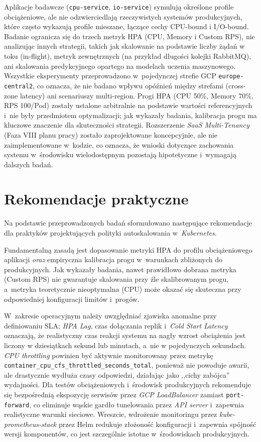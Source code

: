 Aplikacje badawcze (\texttt{cpu-service}, \texttt{io-service}) symulują określone profile obciążeniowe, ale nie odzwierciedlają rzeczywistych systemów produkcyjnych, które często wykazują profile mieszane, łączące cechy CPU-bound i I/O-bound. Badanie ogranicza się do trzech metryk HPA (CPU, Memory i Custom RPS), nie analizując innych strategii, takich jak skalowanie na podstawie liczby żądań w toku (in-flight), metryk zewnętrznych (na przykład długości kolejki RabbitMQ), ani skalowania predykcyjnego opartego na modelach uczenia maszynowego. Wszystkie eksperymenty przeprowadzono w~pojedynczej strefie GCP \texttt{europe-central2}, co oznacza, że nie badano wpływu opóźnień między strefami (cross-zone latency) ani scenariuszy multi-region. Progi HPA (CPU 50\%, Memory 70\%, RPS 100/Pod) zostały ustalone arbitralnie na podstawie wartości referencyjnych i~nie były przedmiotem optymalizacji; jak wykazały badania, kalibracja progu ma kluczowe znaczenie dla skuteczności strategii. Rozszerzenie \textit{SaaS Multi-Tenancy} (Faza VIII planu pracy) zostało zaprojektowane koncepcyjnie, ale nie zaimplementowane w~kodzie, co oznacza, że wnioski dotyczące zachowania systemu w~środowisku wielodostępnym pozostają hipotetyczne i~wymagają dalszych badań.

\section{Rekomendacje praktyczne}

Na podstawie przeprowadzonych badań sformułowano następujące rekomendacje dla praktyków projektujących polityki autoskalowania w~\textit{Kubernetes}.

Fundamentalną zasadą jest dopasowanie metryki HPA do profilu obciążeniowego aplikacji \textit{oraz} empiryczna kalibracja progu w~warunkach zbliżonych do produkcyjnych. Jak wykazały badania, nawet prawidłowo dobrana metryka (Custom RPS) nie gwarantuje skalowania przy źle skalibrowanym progu, a~metryka teoretycznie nieoptymalna (CPU) może okazać się skuteczna przy odpowiedniej konfiguracji limitów i~progów.

W~zakresie operacyjnym należy uwzględniać zjawiska anomalne przy definiowaniu SLA; \textit{HPA Lag}, czas dołączania replik i~\textit{Cold Start Latency} oznaczają, że realistyczny czas reakcji systemu na nagły wzrost obciążenia jest liczony w dziesiątkach sekund lub minutach, a~nie w pojedynczych sekundach. \textit{CPU throttling} powinien być aktywnie monitorowany przez metrykę \texttt{container\_cpu\_cfs\_throttled\_seconds\_total}, ponieważ nie powoduje awarii, ale drastycznie wydłuża czasy odpowiedzi, działając jako ,,cichy zabójca'' wydajności. Dla testów obciążeniowych i~środowisk produkcyjnych rekomenduje się bezpośrednią ekspozycję serwisów przez \textit{GCP LoadBalancer} zamiast \texttt{port-forward}, co eliminuje wąskie gardło tunelowania przez \textit{API server} i~zapewnia realistyczne warunki sieciowe. Wreszcie, wdrożenie monitoringu przez \textit{kube-prometheus-stack} przez Helm redukuje złożoność konfiguracji i~zapewnia spójność wersji komponentów, co jest szczególnie istotne w~środowiskach produkcyjnych.

